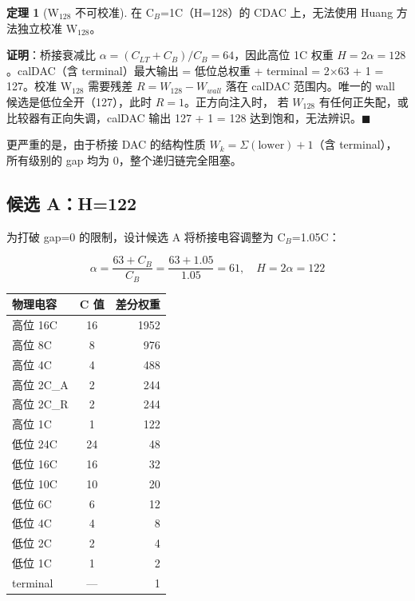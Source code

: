 \documentclass[UTF8,a4paper,12pt]{ctexart}
\theoremstyle{definition}
\newtheorem{theorem}{定理}[section]
\begin{document}
\begin{theorem}[W$_{128}$ 不可校准]
在 C$_B$=1C（H=128）的 CDAC 上，无法使用 Huang 方法独立校准 W$_{128}$。
\end{theorem}

\textbf{证明}：桥接衰减比 $\alpha = (C_{LT} + C_B)/C_B = 64$，因此高位 1C 权重
$H = 2\alpha = 128$。calDAC（含 terminal）最大输出 = 低位总权重 + terminal = 
2$\times$63 + 1 = 127。校准 W$_{128}$ 需要残差 $R = W_{128} - W_{wall}$ 落在
calDAC 范围内。唯一的 wall 候选是低位全开（127），此时 $R = 1$。正方向注入时，
若 $W_{128}$ 有任何正失配，或比较器有正向失调，calDAC 输出 127 + 1 = 128
达到饱和，无法辨识。$\blacksquare$

更严重的是，由于桥接 DAC 的结构性质 $W_k = \Sigma(\text{lower}) + 1$（含 terminal），
所有级别的 gap 均为 0，整个递归链完全阻塞。

\subsection{候选 A：H=122}

为打破 gap=0 的限制，设计候选 A 将桥接电容调整为 C$_B$=1.05C：

\begin{equation}
  \alpha = \frac{63 + C_B}{C_B} = \frac{63 + 1.05}{1.05} = 61,\quad
  H = 2\alpha = 122
\end{equation}

\begin{longtable}{lcr}
\toprule
\textbf{物理电容} & \textbf{C 值} & \textbf{差分权重} \\
\midrule
\endhead
\bottomrule
\endfoot
高位 16C & 16 & 1952 \\
高位 8C & 8 & 976 \\
高位 4C & 4 & 488 \\
高位 2C\_A & 2 & 244 \\
高位 2C\_R & 2 & 244 \\
高位 1C & 1 & 122 \\
低位 24C & 24 & 48 \\
低位 16C & 16 & 32 \\
低位 10C & 10 & 20 \\
低位 6C & 6 & 12 \\
低位 4C & 4 & 8 \\
低位 2C & 2 & 4 \\
低位 1C & 1 & 2 \\
terminal & --- & 1 \\
\bottomrule
\end{longtable}
\end{document}
